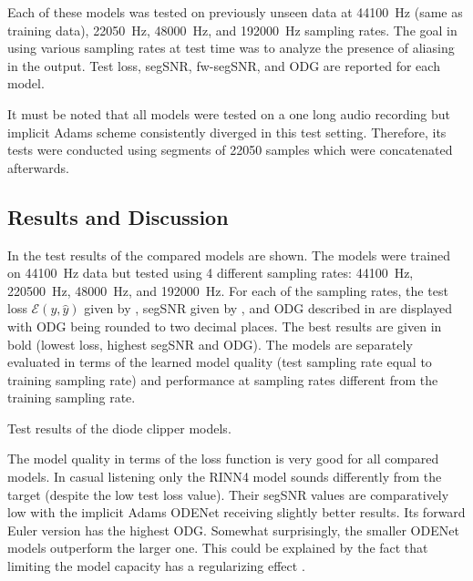 Each of these models was tested on previously unseen data at \SI{44100}{Hz} (same as training data), \SI{22050}{Hz}, \SI{48000}{Hz}, and \SI{192000}{Hz} sampling rates. The goal in using various sampling rates at test time was to analyze the presence of aliasing in the output. Test loss, \ac{segSNR}, \ac{fw-segSNR}, and \ac{ODG} are reported for each model. 

It must be noted that all models were tested on a one long audio recording but implicit Adams scheme consistently diverged in this test setting. Therefore, its tests were conducted using segments of 22050 samples which were concatenated afterwards.

\subsection{Results and Discussion}
\label{sec:diode_clipper_results}

In  the test results of the compared models are shown. The models were trained on \SI{44100}{Hz} data but tested using 4 different sampling rates: \SI{44100}{Hz}, \SI{220500}{Hz}, \SI{48000}{Hz}, and \SI{192000}{Hz}. For each of the sampling rates, the test loss $\mathcal{E}(y, \hat{y})$ given by , \ac{segSNR} given by , and \ac{ODG} described in 
are displayed with \ac{ODG} being rounded to two decimal places. The best results are given in bold (lowest loss, highest \ac{segSNR} and \ac{ODG}). The models are separately evaluated in terms of the learned model quality (test sampling rate equal to training sampling rate) and performance at sampling rates different from the training sampling rate. 


\begin{table}[]
    \caption{Test results of the diode clipper models.}
    
    \label{tab:diode_clipper_results}
\end{table}

The model quality in terms of the loss function is very good for all compared models. In casual listening only the \ac{RINN}4 model sounds differently from the target (despite the low test loss value). Their \ac{segSNR} values are comparatively low with the implicit Adams ODENet receiving slightly better results. Its forward Euler version has the highest \ac{ODG}. Somewhat surprisingly, the smaller ODENet models outperform the larger one. This could be explained by the fact that limiting the model capacity has a regularizing effect \cite{Goodfellow-et-al-2016}.

